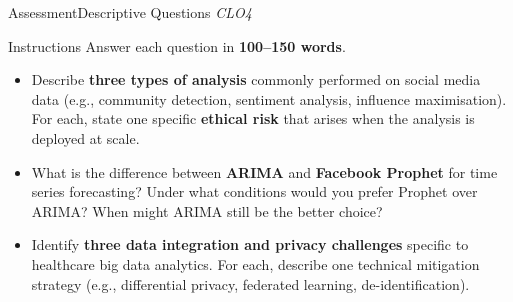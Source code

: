 \documentclass[aspectratio=169,10pt]{beamer}
\begin{document}
\begin{frame}{Assessment\textemdash Descriptive Questions \hfill\small\textit{CLO4}}
  \begin{block}{Instructions}
    Answer each question in \textbf{100--150 words}.
  \end{block}
  \vspace{8pt}
  \begin{itemize}
    \item[\textbf{D1.}] Describe \textbf{three types of analysis} commonly performed on social media data (e.g., community detection, sentiment analysis, influence maximisation).  For each, state one specific \textbf{ethical risk} that arises when the analysis is deployed at scale.
  \end{itemize}
  \vspace{8pt}
  \begin{itemize}
    \item[\textbf{D2.}] What is the difference between \textbf{ARIMA} and \textbf{Facebook Prophet} for time series forecasting?  Under what conditions would you prefer Prophet over ARIMA?  When might ARIMA still be the better choice?
  \end{itemize}
  \vspace{8pt}
  \begin{itemize}
    \item[\textbf{D3.}] Identify \textbf{three data integration and privacy challenges} specific to healthcare big data analytics.  For each, describe one technical mitigation strategy (e.g., differential privacy, federated learning, de-identification).
  \end{itemize}
\end{frame}
\end{document}
